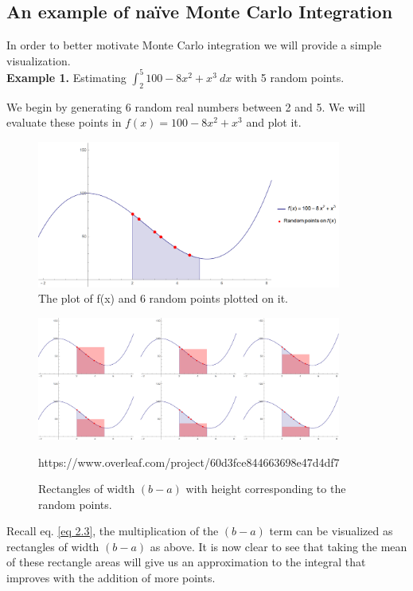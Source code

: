 \documentclass[12pt]{article}
\numberwithin{equation}{section}
\begin{document}
\subsection{An example of naïve Monte Carlo Integration}
In order to better motivate Monte Carlo integration we will provide a simple visualization.\\
\textbf{Example 1.} Estimating $\int_2^5 100 - 8x^2 + x^3\ dx$ with 5 random points.
\par We begin by generating 6 random real numbers between 2 and 5. We will evaluate these points in $f(x)=100-8x^2+x^3$ and plot it.
\begin{figure}[!htb]
    \centering
    \includegraphics[width=10cm]{Images/pointsexample.png}
    \caption{The plot of f(x) and 6 random points plotted on it.}
    \label{fig:pointsexample}
\end{figure}
\begin{figure}[!htb]
    \centering
    \includegraphics[width=10cm]{Images/rectexample.png}
    \caption{Rectangles of width $(b-a)$ with height corresponding to the random points.}https://www.overleaf.com/project/60d3fce844663698e47d4df7
    \label{fig:rectexample}
\end{figure}\par
Recall eq. \ref{eq 2.3}, the multiplication of the $(b-a)$ term can be visualized as rectangles of width $(b-a)$ as above.
It is now clear to see that taking the mean of these rectangle areas will give us an approximation to the integral that improves with the addition of more points.
\clearpage
\end{document}
